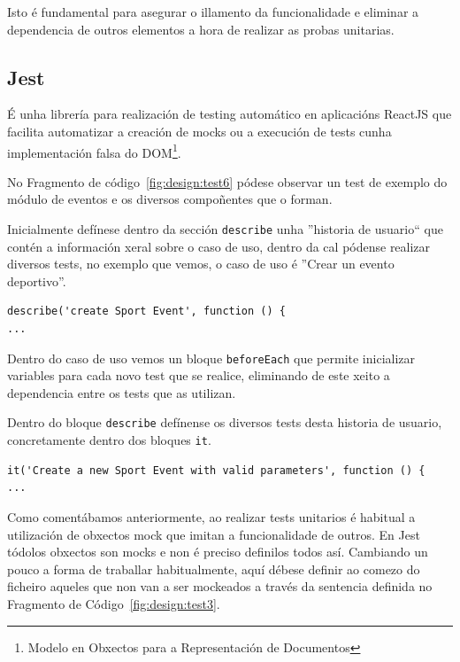       Isto é fundamental para asegurar o illamento da funcionalidade e eliminar 
a dependencia de outros elementos a hora de realizar as probas unitarias.

    \subsection{Jest}
    É unha librería para realización de testing automático en aplicacións 
ReactJS que facilita automatizar a creación de mocks ou a execución de tests 
cunha implementación falsa do DOM\footnote{Modelo en Obxectos para a 
Representación de Documentos}.

    No Fragmento de código~\ref{fig:design:test6} pódese observar un test 
de exemplo do módulo de eventos e os diversos compoñentes que o forman. 

    Inicialmente defínese dentro da sección \lstinline{describe} unha 
''historia de usuario`` que contén a información xeral sobre o caso de uso, 
dentro da cal pódense realizar diversos tests, no exemplo que vemos, o caso de 
uso é ''Crear un evento deportivo''.

    \lstset{}
    \begin{lstlisting}[caption=Definición dunha historia de usuario en Jest., 
label=fig:design:test1]
describe('create Sport Event', function () {
...
    \end{lstlisting}

    Dentro do caso de uso vemos un bloque \lstinline{beforeEach} que permite 
inicializar variables para cada novo test que se realice, eliminando de este 
xeito a dependencia entre os tests que as utilizan.

    Dentro do bloque \lstinline{describe} defínense os diversos tests desta 
historia de usuario, concretamente dentro dos bloques \lstinline{it}.

    \lstset{}
    \begin{lstlisting}[caption=Definición dun test en Jest., 
label=fig:design:test2]
it('Create a new Sport Event with valid parameters', function () {
...
    \end{lstlisting}

    Como comentábamos anteriormente, ao realizar tests unitarios é habitual a 
utilización de obxectos mock que imitan a funcionalidade de outros.
    En Jest tódolos obxectos son mocks e non é preciso definilos todos así.
Cambiando un pouco a forma de traballar habitualmente, aquí débese definir ao 
comezo do ficheiro aqueles que non van a ser mockeados a través da sentencia 
definida no Fragmento de Código~\ref{fig:design:test3}.

